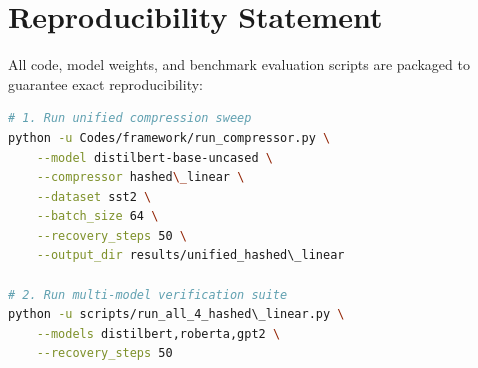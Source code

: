 \section{Reproducibility Statement}
All code, model weights, and benchmark evaluation scripts are packaged to guarantee exact reproducibility:
\begin{lstlisting}[language=bash]
# 1. Run unified compression sweep
python -u Codes/framework/run_compressor.py \
    --model distilbert-base-uncased \
    --compressor hashed\_linear \
    --dataset sst2 \
    --batch_size 64 \
    --recovery_steps 50 \
    --output_dir results/unified_hashed\_linear

# 2. Run multi-model verification suite
python -u scripts/run_all_4_hashed\_linear.py \
    --models distilbert,roberta,gpt2 \
    --recovery_steps 50
\end{lstlisting}
